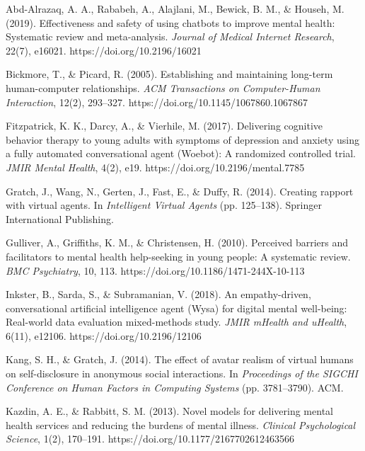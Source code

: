 \documentclass[11pt,a4paper]{report}
\begin{document}
\begin{enumerate}[label={[\arabic*]}, leftmargin=1.5cm, itemsep=3pt, parsep=0pt]

\item Abd-Alrazaq, A. A., Rababeh, A., Alajlani, M., Bewick, B. M., \& Househ, M. (2019). Effectiveness and safety of using chatbots to improve mental health: Systematic review and meta-analysis. \textit{Journal of Medical Internet Research}, 22(7), e16021. https://doi.org/10.2196/16021

\item Bickmore, T., \& Picard, R. (2005). Establishing and maintaining long-term human-computer relationships. \textit{ACM Transactions on Computer-Human Interaction}, 12(2), 293–327. https://doi.org/10.1145/1067860.1067867

\item Fitzpatrick, K. K., Darcy, A., \& Vierhile, M. (2017). Delivering cognitive behavior therapy to young adults with symptoms of depression and anxiety using a fully automated conversational agent (Woebot): A randomized controlled trial. \textit{JMIR Mental Health}, 4(2), e19. https://doi.org/10.2196/mental.7785

\item Gratch, J., Wang, N., Gerten, J., Fast, E., \& Duffy, R. (2014). Creating rapport with virtual agents. In \textit{Intelligent Virtual Agents} (pp. 125–138). Springer International Publishing.

\item Gulliver, A., Griffiths, K. M., \& Christensen, H. (2010). Perceived barriers and facilitators to mental health help-seeking in young people: A systematic review. \textit{BMC Psychiatry}, 10, 113. https://doi.org/10.1186/1471-244X-10-113

\item Inkster, B., Sarda, S., \& Subramanian, V. (2018). An empathy-driven, conversational artificial intelligence agent (Wysa) for digital mental well-being: Real-world data evaluation mixed-methods study. \textit{JMIR mHealth and uHealth}, 6(11), e12106. https://doi.org/10.2196/12106

\item Kang, S. H., \& Gratch, J. (2014). The effect of avatar realism of virtual humans on self-disclosure in anonymous social interactions. In \textit{Proceedings of the SIGCHI Conference on Human Factors in Computing Systems} (pp. 3781–3790). ACM.

\item Kazdin, A. E., \& Rabbitt, S. M. (2013). Novel models for delivering mental health services and reducing the burdens of mental illness. \textit{Clinical Psychological Science}, 1(2), 170–191. https://doi.org/10.1177/2167702612463566


\end{enumerate}
\end{document}
